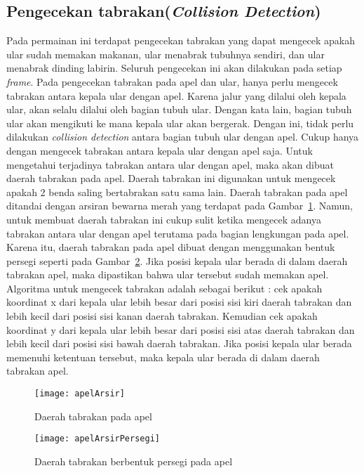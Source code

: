 \subsection{Pengecekan tabrakan(\textit{Collision Detection})}
Pada permainan ini terdapat pengecekan tabrakan yang dapat mengecek apakah ular sudah memakan makanan, ular menabrak tubuhnya sendiri, dan ular menabrak dinding labirin. Seluruh pengecekan ini akan dilakukan pada setiap \textit{frame}. Pada pengecekan tabrakan pada apel dan ular, hanya perlu mengecek tabrakan antara kepala ular dengan apel. Karena jalur yang dilalui oleh kepala ular, akan selalu dilalui oleh bagian tubuh ular. Dengan kata lain, bagian tubuh ular akan mengikuti ke mana kepala ular akan bergerak. Dengan ini, tidak perlu dilakukan \textit{collision detection} antara bagian tubuh ular dengan apel. Cukup hanya dengan mengecek tabrakan antara kepala ular dengan apel saja. Untuk mengetahui terjadinya tabrakan antara ular dengan apel, maka akan dibuat daerah tabrakan pada apel. Daerah tabrakan ini digunakan untuk mengecek apakah 2 benda saling bertabrakan satu sama lain. Daerah tabrakan pada apel ditandai dengan arsiran bewarna merah yang terdapat pada Gambar~\ref{fig:apelArsir}. Namun, untuk membuat daerah tabrakan ini cukup sulit ketika mengecek adanya tabrakan antara ular dengan apel terutama pada bagian lengkungan pada apel. Karena itu, daerah tabrakan pada apel dibuat dengan menggunakan bentuk persegi seperti pada Gambar~\ref{fig:apelArsirPersegi}. Jika posisi kepala ular berada di dalam daerah tabrakan apel, maka dipastikan bahwa ular tersebut sudah memakan apel. Algoritma untuk mengecek tabrakan adalah sebagai berikut : cek apakah koordinat x dari kepala ular lebih besar dari posisi sisi kiri daerah tabrakan dan lebih kecil dari posisi sisi kanan daerah tabrakan. Kemudian cek apakah koordinat y dari kepala ular lebih besar dari posisi sisi atas daerah tabrakan dan lebih kecil dari posisi sisi bawah daerah tabrakan. Jika posisi kepala ular berada memenuhi ketentuan tersebut, maka kepala ular berada di dalam daerah tabrakan apel.\\

\begin{figure}[H]
	\centering  
	\texttt{[image: apelArsir]}  
	\caption[Daerah tabrakan pada apel]{Daerah tabrakan pada apel}
	\label{fig:apelArsir} 
\end{figure}

\begin{figure}[H]
	\centering  
	\texttt{[image: apelArsirPersegi]}  
	\caption[Daerah tabrakan berbentuk persegi pada apel]{Daerah tabrakan berbentuk persegi pada apel}
	\label{fig:apelArsirPersegi} 
\end{figure}

